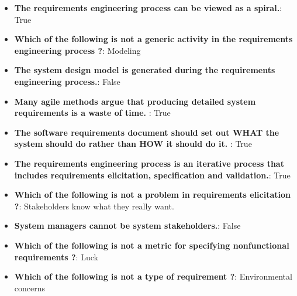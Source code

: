 \documentclass{report}
\begin{document}
    \pagebreak 
    \begin{itemize}
        \item \textbf{The requirements engineering process can be viewed as a spiral.}: True
        \item \textbf{Which of the following is not a generic activity in the requirements engineering process ?}: Modeling
        \item \textbf{The system design model is generated during the requirements engineering process.}: False
        \item \textbf{Many agile methods argue that producing detailed system requirements is a waste of time. }: True
        \item \textbf{The software requirements document should set out WHAT the system should do rather than HOW it should do it. }: True
        \item \textbf{The requirements engineering process is an iterative process that includes requirements elicitation, specification and validation.}: True
        \item \textbf{Which of the following is not a problem in requirements elicitation ?}: Stakeholders know what they really want.
        \item \textbf{System managers cannot be system stakeholders.}: False
        \item \textbf{Which of the following is not a metric for specifying nonfunctional requirements ?}: Luck
        \item \textbf{Which of the following is not a type of requirement ?}: Environmental concerns
    \end{itemize}
\end{document}
